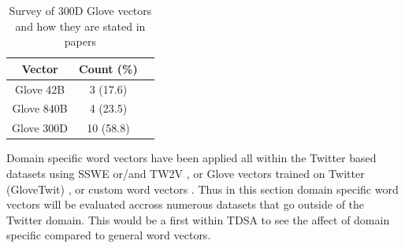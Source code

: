 \begin{table}[h!]
    \centering
    \begin{tabular}{|c|c|c|}
        \hline
        Vector & Count (\%)  \\
        \hline 
        Glove 42B & 3 (17.6)\\
        \hline 
        Glove 840B & 4 (23.5)\\
        \hline 
        Glove 300D & 10 (58.8)\\
        \hline
    \end{tabular}
    \caption{Survey of 300D Glove vectors and how they are stated in papers}
    \label{table:repro_survey_glove_vector_counts}
\end{table}

Domain specific word vectors have been applied all within the Twitter based datasets \citep{mitchell-etal-2013-open,dong-etal-2014-adaptive,wang-etal-2017-tdparse} using SSWE or/and TW2V \citep{vo2015target,tang-etal-2016-effective,zhang2016gated,wang-etal-2017-tdparse}, or Glove vectors trained on Twitter (GloveTwit) \citep{tang-etal-2016-effective}, or custom word vectors \citep{zhang-etal-2015-neural}. Thus in this section domain specific word vectors will be evaluated accross numerous datasets that go outside of the Twitter domain. This would be a first within TDSA to see the affect of domain specific compared to general word vectors.\\


